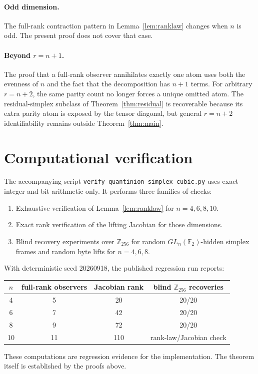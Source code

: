 \documentclass[11pt]{article}
\theoremstyle{definition}
\newcommand{\F}{\mathbb{F}}
\newcommand{\Z}{\mathbb{Z}}
\begin{document}
\paragraph{Odd dimension.}
The full-rank contraction pattern in Lemma~\ref{lem:ranklaw} changes when $n$ is odd. The present proof does not cover that case.

\paragraph{Beyond $r=n+1$.}
The proof that a full-rank observer annihilates exactly one atom uses both the evenness of $n$ and the fact that the decomposition has $n+1$ terms. For arbitrary $r=n+2$, the same parity count no longer forces a unique omitted atom. The residual-simplex subclass of Theorem~\ref{thm:residual} is recoverable because its extra parity atom is exposed by the tensor diagonal, but general $r=n+2$ identifiability remains outside Theorem~\ref{thm:main}.

\section{Computational verification}
The accompanying script \texttt{verify\_quantinion\_simplex\_cubic.py} uses exact integer and bit arithmetic only. It performs three families of checks:
\begin{enumerate}[leftmargin=*]
  \item Exhaustive verification of Lemma~\ref{lem:ranklaw} for $n=4,6,8,10$.
  \item Exact rank verification of the lifting Jacobian for those dimensions.
  \item Blind recovery experiments over $\Z_{256}$ for random $GL_n(\F_2)$-hidden simplex frames and random byte lifts for $n=4,6,8$.
\end{enumerate}
With deterministic seed 20260918, the published regression run reports:
\begin{center}
\begin{tabular}{@{}cccc@{}}
\toprule
$n$ & full-rank observers & Jacobian rank & blind $\Z_{256}$ recoveries \\
\midrule
4 & 5 & 20 & 20/20 \\
6 & 7 & 42 & 20/20 \\
8 & 9 & 72 & 20/20 \\
10 & 11 & 110 & rank-law/Jacobian check \\
\bottomrule
\end{tabular}
\end{center}
These computations are regression evidence for the implementation. The theorem itself is established by the proofs above.
\end{document}
